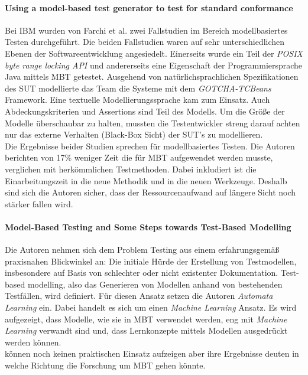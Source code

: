 \paragraph{Using a model-based test generator to test for standard conformance\cite{farchi_using_2002}}\label{sec:ibm_fallstudie}
Bei IBM wurden von Farchi et al. zwei Fallstudien im Bereich modellbasiertes Testen durchgeführt. Die beiden Fallstudien waren auf sehr unterschiedlichen Ebenen der Softwareentwicklung angesiedelt. Einerseits wurde ein Teil der \textit{POSIX byte range locking API}\cite{posix_2008} und andererseits eine Eigenschaft der Programmiersprache Java mittels MBT getestet. Ausgehend von natürlichsprachlichen Spezifikationen des SUT modellierte das Team die Systeme mit dem \textit{GOTCHA-TCBeans} Framework. Eine textuelle Modellierungssprache kam zum Einsatz. Auch Abdeckungskriterien und Assertions sind Teil des Modells. Um die Größe der Modelle überschaubar zu halten, mussten die Testentwickler streng darauf achten nur das externe Verhalten (Black-Box Sicht) der SUT's zu modellieren.\\
Die Ergebnisse beider Studien sprechen für modellbasiertes Testen. Die Autoren berichten von 17\% weniger Zeit die für MBT aufgewendet werden musste, verglichen mit herkömmlichen Testmethoden. Dabei inkludiert ist die Einarbeitungszeit in die neue Methodik und in die neuen Werkzeuge. Deshalb sind sich die Autoren sicher, dass der Ressourcenaufwand auf längere Sicht noch stärker fallen wird.

\paragraph{Model-Based Testing and Some Steps towards Test-Based Modelling\cite{tretmans_model-based_2011}} \label{sec:test_based_modelling} Die Autoren nehmen sich dem Problem Testing aus einem erfahrungsgemäß praxisnahen Blickwinkel an: Die initiale Hürde der Erstellung von Testmodellen, insbesondere auf Basis von schlechter oder nicht existenter Dokumentation. Test-based modelling, also das Generieren von Modellen anhand von bestehenden Testfällen, wird definiert. Für diesen Ansatz setzen die Autoren \textit{Automata Learning} ein. Dabei handelt es sich um einen \textit{Machine Learning} Ansatz\cite{narendra_learning_1974}. Es wird aufgezeigt, dass Modelle, wie sie in MBT verwendet werden, eng mit \textit{Machine Learning} verwandt sind und, dass Lernkonzepte mittels Modellen ausgedrückt werden können.\\
\citeauthor{tretmans_model-based_2011} können noch keinen praktischen Einsatz aufzeigen aber ihre Ergebnisse deuten in welche Richtung die Forschung um MBT gehen könnte.

